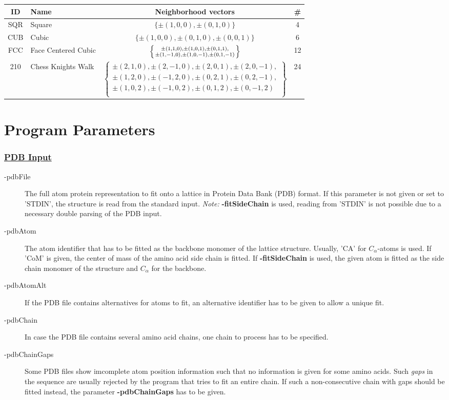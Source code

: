 \documentclass{article}
\newcommand{\CA}{$C_\alpha$}
\begin{document}
\vspace{0.5em}
\begin{tabular}{c|l|c|c}
	ID & Name & Neighborhood vectors & \#\\
	\hline
	SQR & Square & $\{\pm(1,0,0),\pm(0,1,0)\}$ & 4
	\\
	CUB & Cubic & $\{\pm(1,0,0),\pm(0,1,0),\pm(0,0,1)\}$ & 6
	\\
	FCC & Face Centered Cubic & 
	$\left\{\pm(1,1,0),\pm(1,0,1),\pm(0,1,1), \atop
	\pm(1,-1,0),\pm(1,0,-1),\pm(0,1,-1)\right\}$ & 12 
	\\
	210 & Chess Knights Walk & 
	\tiny
	$\left\{\begin{matrix}
	\pm(2,1,0),\pm(2,-1,0),\pm(2,0,1),\pm(2,0,-1), \\
	\pm(1,2,0),\pm(-1,2,0),\pm(0,2,1),\pm(0,2,-1), \\
	\pm(1,0,2),\pm(-1,0,2),\pm(0,1,2),\pm(0,-1,2)\\
     \end{matrix} \right\}$ & 24 
	\\
\end{tabular}

\section{Program Parameters}

\subsubsection*{\underline{ PDB Input }}

\begin{description}
	\item[-pdbFile] The full atom protein representation to fit onto a
	lattice in Protein Data Bank (PDB) format. If this parameter is not given or
	set to 'STDIN', the structure is read from the standard input.
	\newline\emph{Note:} \mbox{\bfseries -fitSideChain} is used, reading from
	'STDIN' is not possible due to a necessary double parsing of the PDB input.
	\item[-pdbAtom] The atom identifier that has to be fitted as the backbone
	monomer of the lattice structure. Usually, 'CA' for \CA-atoms is used.
	If 'CoM' is given, the center of mass of the amino acid side chain is
	fitted. If \mbox{\bfseries -fitSideChain} is used, the given atom is fitted as
	the side chain monomer of the structure and \CA{} for the backbone. 
	\item[-pdbAtomAlt] If the PDB file contains alternatives for atoms to fit, an
	alternative identifier has to be given to allow a unique fit.
	\item[-pdbChain] In case the PDB file contains several amino acid chains, one
	chain to process has to be specified.
	\item[-pdbChainGaps] Some PDB files show imcomplete atom position information
	such that no information is given for some amino acids. Such \emph{gaps} in
	the sequence are usually rejected by the program that tries to fit an entire
	chain. If such a non-consecutive chain with gaps should be fitted instead, the
	parameter \mbox{\bfseries -pdbChainGaps} has to be given.
\end{description}
\end{document}
